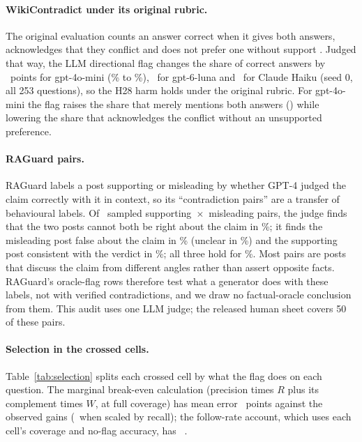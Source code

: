 \paragraph{WikiContradict under its original rubric.} The original evaluation counts an answer correct when it gives
both answers, acknowledges that they conflict and does not prefer one without support
\citep[\S3.4]{hou2024wikicontradict}. Judged that way, the LLM directional flag changes the share of correct answers
by \wikiOrigMiniEff\ points for gpt-4o-mini (\wikiOrigMiniPlain\% to \wikiOrigMiniDir\%), \wikiOrigLunaEff\ for
gpt-6-luna and \wikiOrigHaikuEff\ for Claude Haiku (seed 0, all 253 questions), so the H28 harm holds under the
original rubric. For gpt-4o-mini the flag raises the share that merely mentions both answers (\wikiBothMiniEff) while
lowering the share that acknowledges the conflict without an unsupported preference.

\paragraph{RAGuard pairs.} RAGuard labels a post supporting or misleading by whether GPT-4 judged the claim correctly
with it in context, so its ``contradiction pairs'' are a transfer of behavioural labels. Of \rgAudN\ sampled
supporting~$\times$~misleading pairs, the judge finds that the two posts cannot both be right about the claim in
\rgAudContradict\%; it finds the misleading post false about the claim in \rgAudBFalse\% (unclear in
\rgAudBUnclear\%) and the supporting post consistent with the verdict in \rgAudASupports\%; all three hold for
\rgAudVerified\%. Most pairs are posts that discuss the claim from different angles rather than assert opposite
facts. RAGuard's oracle-flag rows therefore test what a generator does with these labels, not with verified
contradictions, and we draw no factual-oracle conclusion from them. This audit uses one LLM judge; the released
human sheet covers 50 of these pairs.


\paragraph{Selection in the crossed cells.} Table~\ref{tab:selection} splits each crossed cell by what the flag does
on each question. The marginal break-even calculation (precision times $R$ plus its complement times $W$, at full
coverage) has mean error \selMargMae\ points against the observed gains (\selMargCovMae\ when scaled by recall); the
follow-rate account, which uses each cell's coverage and no-flag accuracy, has \predEightMae\ \predEightMaeCI.
